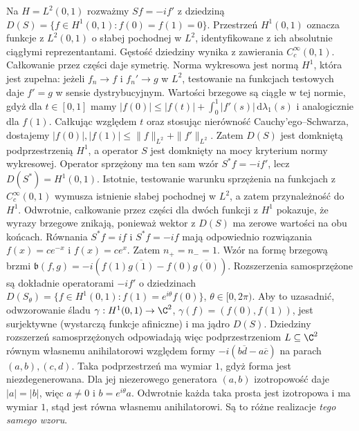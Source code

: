 \begin{przyklad}
\label{ex:momentum-interval33}
Na $H=L^2(0,1)$ rozważmy
$Sf=-if'$ z dziedziną
$D(S)=\{f\in H^1(0,1):f(0)=f(1)=0\}$.
Przestrzeń $H^1(0,1)$ oznacza funkcje z $L^2(0,1)$
o słabej pochodnej w $L^2$, identyfikowane z ich
absolutnie ciągłymi reprezentantami.
Gęstość dziedziny wynika z zawierania $C_c^\infty(0,1)$.
Całkowanie przez części daje symetrię. Norma wykresowa jest
normą $H^1$, która jest zupełna: jeżeli $f_n\to f$ i $f_n'\to g$
w $L^2$, testowanie na funkcjach testowych daje $f'=g$ w sensie
dystrybucyjnym. Wartości brzegowe są ciągłe w tej normie, gdyż
dla $t\in[0,1]$ mamy
$|f(0)|\le |f(t)|+\int_0^1|f'(s)|\,\mathrm d\lambda_1(s)$
i analogicznie dla $f(1)$. Całkując względem $t$ oraz stosując
nierówność Cauchy'ego--Schwarza, dostajemy
$|f(0)|,|f(1)|\le\|f\|_{L^2}+\|f'\|_{L^2}$.
Zatem $D(S)$ jest domkniętą podprzestrzenią $H^1$, a operator
$S$ jest domknięty na mocy kryterium normy wykresowej.
Operator sprzężony ma ten sam wzór $S^*f=-if'$, lecz
$D(S^*)=H^1(0,1)$. Istotnie, testowanie warunku
sprzężenia na funkcjach z $C_c^\infty(0,1)$ wymusza istnienie
słabej pochodnej w $L^2$, a zatem przynależność do $H^1$.
Odwrotnie, całkowanie przez części dla dwóch funkcji z $H^1$
pokazuje, że wyrazy brzegowe znikają, ponieważ
wektor z $D(S)$ ma zerowe wartości na obu końcach.
Równania $S^*f=if$ i $S^*f=-if$ mają odpowiednio
rozwiązania $f(x)=ce^{-x}$ i $f(x)=ce^x$.
Zatem $n_+=n_-=1$. Wzór na formę brzegową brzmi
$\mathfrak b(f,g)=-i(f(1)\overline{g(1)}-f(0)\overline{g(0)})$.
Rozszerzenia samosprzężone są dokładnie operatorami
$-if'$ o dziedzinach
$D(S_\theta)=\{f\in H^1(0,1):f(1)=e^{i\theta}f(0)\}$,
$\theta\in[0,2\pi)$. Aby to uzasadnić, odwzorowanie śladu
$\gamma:H^1(0,1)\to\C^2$, $\gamma(f)=(f(0),f(1))$,
jest surjektywne (wystarczą funkcje afiniczne) i ma jądro $D(S)$.
Dziedziny rozszerzeń samosprzężonych odpowiadają więc podprzestrzeniom
$L\subseteq\C^2$ równym własnemu anihilatorowi względem formy
$-i(b\overline d-a\overline c)$ na parach $(a,b),(c,d)$.
Taka podprzestrzeń ma wymiar $1$, gdyż forma jest niezdegenerowana.
Dla jej niezerowego generatora $(a,b)$ izotropowość daje $|a|=|b|$,
więc $a\ne0$ i $b=e^{i\theta}a$. Odwrotnie każda taka prosta
jest izotropowa i ma wymiar $1$, stąd jest równa własnemu
anihilatorowi. Są to różne realizacje \emph{tego samego wzoru}.
\end{przyklad}

